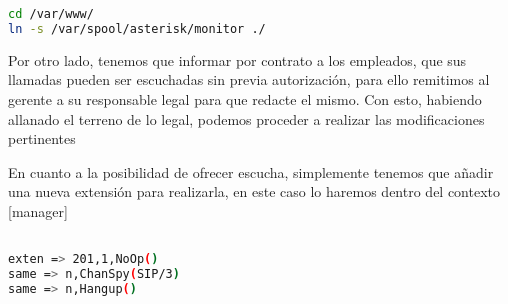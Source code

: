 \begin{lstlisting}[language=sh]
cd /var/www/
ln -s /var/spool/asterisk/monitor ./
\end{lstlisting}

Por otro lado, tenemos que informar por contrato a los empleados, que sus llamadas pueden ser escuchadas sin previa autorización, para ello remitimos al gerente a su responsable legal para que redacte el mismo. Con esto, habiendo allanado el terreno de lo legal, podemos proceder a realizar las modificaciones pertinentes

En cuanto a la posibilidad de ofrecer escucha, simplemente tenemos que añadir una nueva extensión para realizarla, en este caso lo haremos dentro del contexto [manager]

\begin{lstlisting}[language=bash,title={/etc/asterisk/extensions.conf}]

exten => 201,1,NoOp()
same => n,ChanSpy(SIP/3)
same => n,Hangup()

\end{lstlisting}